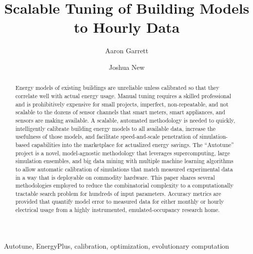 \documentclass[preprint, review, 12pt]{elsarticle}
\begin{document}
\begin{frontmatter}

\title{Scalable Tuning of Building Models to Hourly Data}

\author[atr:garrett]{Aaron Garrett} %
\author[atr:new]{Joshua New}

\address[atr:garrett]{Mathematical, Computing, and Information Sciences, Jacksonville State University, Jacksonville, AL, USA}
\address[atr:new]{Oak Ridge National Laboratory, Oak Ridge, TN, USA}


\begin{abstract}
Energy models of existing buildings are unreliable unless calibrated so that they correlate well with actual energy usage. Manual tuning requires a skilled professional and is prohibitively expensive for small projects, imperfect, non-repeatable, and not scalable to the dozens of sensor channels that smart meters, smart appliances, and sensors are making available. A scalable, automated methodology is needed to quickly, intelligently calibrate building energy models to all available data, increase the usefulness of those models, and facilitate speed-and-scale penetration of simulation-based capabilities into the marketplace for actualized energy savings. The ``Autotune'' project is a novel, model-agnostic methodology that leverages supercomputing, large simulation ensembles, and big data mining with multiple machine learning algorithms to allow automatic calibration of simulations that match measured experimental data in a way that is deployable on commodity hardware. This paper shares several methodologies employed to reduce the combinatorial complexity to a computationally tractable search problem for hundreds of input parameters. Accuracy metrics are provided that quantify model error to measured data for either monthly or hourly electrical usage from a highly instrumented, emulated-occupancy research home.
\end{abstract}

\begin{keyword}
Autotune, EnergyPlus, calibration, optimization, evolutionary computation
\end{keyword}

\end{frontmatter}

\end{document}
